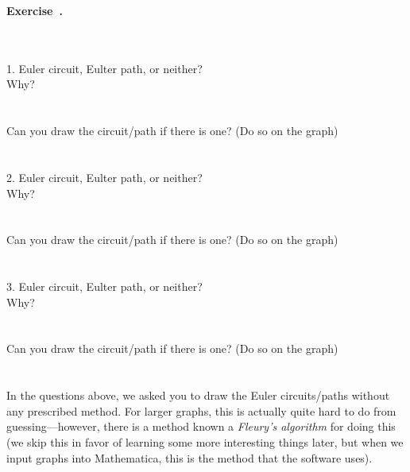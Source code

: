 \documentclass[12pt]{article}
\newcounter{exercise}[section]
\newenvironment{exercise}[1][]{\refstepcounter{exercise}\par\medskip
	\noindent \textbf{Exercise~\thesection.\theexercise #1} \rmfamily}{\medskip}
\begin{document}
\begin{exercise}
\\
\\
1. Euler circuit, Eulter path, or neither?\\
Why?\\
\\
\\
Can you draw the circuit/path if there is one? (Do so on the graph)
\\
\\
\\
2. Euler circuit, Eulter path, or neither?\\
Why?\\
\\
\\
Can you draw the circuit/path if there is one? (Do so on the graph)
\\
\\
\\
3. Euler circuit, Eulter path, or neither?\\
Why?\\
\\
\\
Can you draw the circuit/path if there is one? (Do so on the graph)
\\
\\
\\
\end{exercise}
In the questions above, we asked you to draw the Euler circuits/paths without any prescribed method. For larger graphs, this is actually quite hard to do from guessing---however, there is a method known a \emph{Fleury's algorithm} for doing this (we skip this in favor of learning some more interesting things later, but when we input graphs into Mathematica, this is the method that the software uses).
\end{document}
